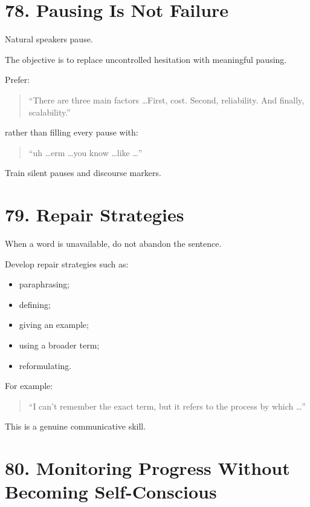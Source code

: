 \section*{78. Pausing Is Not Failure}

Natural speakers pause.

The objective is to replace uncontrolled hesitation with meaningful pausing.

Prefer:

\begin{quote}
``There are three main factors \ldots First, cost. Second, reliability. And finally, scalability.''
\end{quote}

rather than filling every pause with:

\begin{quote}
``uh \ldots erm \ldots you know \ldots like \ldots''
\end{quote}

Train silent pauses and discourse markers.

\section*{79. Repair Strategies}

When a word is unavailable, do not abandon the sentence.

Develop repair strategies such as:

\begin{itemize}
    \item paraphrasing;
    \item defining;
    \item giving an example;
    \item using a broader term;
    \item reformulating.
\end{itemize}

For example:

\begin{quote}
``I can't remember the exact term, but it refers to the process by which \ldots''
\end{quote}

This is a genuine communicative skill.

\section*{80. Monitoring Progress Without Becoming Self-Conscious}

